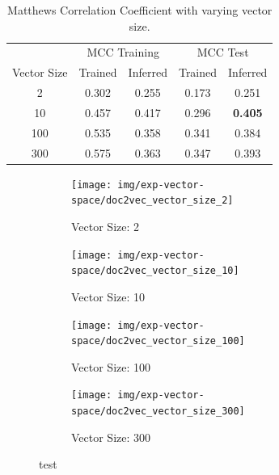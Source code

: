 \begin{table}[h]
  \begin{center}
    \begin{tabular}{ c | *2c | *2c }
      \toprule
       & \multicolumn{2}{c|}{MCC Training} & \multicolumn{2}{|c}{MCC Test}\\
      Vector Size & Trained & Inferred & Trained & Inferred \\
      \midrule
      2   & 0.302 & 0.255 & 0.173 & 0.251 \\
      10  & 0.457 & 0.417 & 0.296 & \textbf{0.405} \\
      100 & 0.535 & 0.358 & 0.341 & 0.384 \\
      300 & 0.575 & 0.363 & 0.347 & 0.393 \\
      \bottomrule
    \end{tabular}
  \caption{Matthews Correlation Coefficient with varying vector size.}
\label{tab:Paragraph Vector Parameter Results Size}
\end{center}
\end{table}

\begin{figure}[h!]
    \centering
    \begin{subfigure}[b]{0.49\textwidth}
      \texttt{[image: img/exp-vector-space/doc2vec\_vector\_size\_2]}
      \caption{Vector Size: 2}
\label{fig:doc2vec_vector_size_2}
    \end{subfigure}
    \begin{subfigure}[b]{0.49\textwidth}
      \texttt{[image: img/exp-vector-space/doc2vec\_vector\_size\_10]}
      \caption{Vector Size: 10}
\label{fig:doc2vec_vector_size_10}
    \end{subfigure}
    \begin{subfigure}[b]{0.49\textwidth}
      \texttt{[image: img/exp-vector-space/doc2vec\_vector\_size\_100]}
      \caption{Vector Size: 100}
\label{fig:doc2vec_vector_size_100}
  \end{subfigure}
  \begin{subfigure}[b]{0.49\textwidth}
    \texttt{[image: img/exp-vector-space/doc2vec\_vector\_size\_300]}
    \caption{Vector Size: 300}
\label{fig:doc2vec_vector_size_300}
  \end{subfigure}
\caption{test}
\label{fig:doc2vec_vector_size}
\end{figure}


